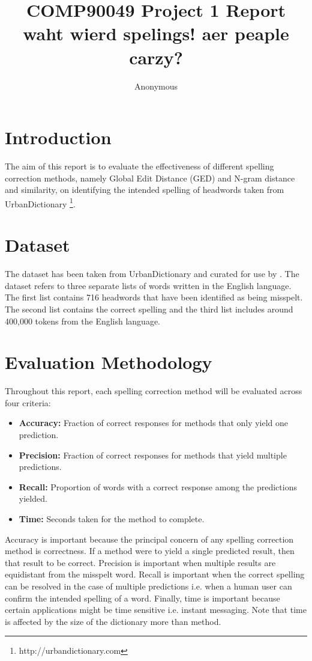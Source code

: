 \documentclass[11pt]{article}
\title{COMP90049 Project 1 Report \\
waht wierd spelings! aer peaple carzy?}
\author{Anonymous}
\begin{document}
\maketitle



\section{Introduction}

The aim of this report is to evaluate the effectiveness of different spelling correction methods, namely Global Edit Distance (GED) and N-gram distance and similarity, on identifying the intended spelling of headwords taken from UrbanDictionary \footnote{http://urbandictionary.com}.

\section{Dataset}
The dataset has been taken from UrbanDictionary and curated for use by . The dataset refers to three separate lists of words written in the English language. The first list contains 716 headwords that have been identified as being misspelt. The second list contains the correct spelling and the third list includes around 400,000 tokens from the English language.


\section{Evaluation Methodology}
Throughout this report, each spelling correction method will be evaluated across four criteria:
\begin{itemize}
	\item \textbf{Accuracy:} Fraction of correct responses for methods that only yield one prediction.
	\item \textbf{Precision:} Fraction of correct responses for methods that yield multiple predictions.
	\item \textbf{Recall:} Proportion of words with a correct response among the predictions yielded.
	\item \textbf{Time:} Seconds taken for the method to complete.
\end{itemize}
Accuracy is important because the principal concern of any spelling correction method is correctness. If a method were to yield a single predicted result, then that result to be correct. Precision is important when multiple results are equidistant from the misspelt word. Recall is important when the correct spelling can be resolved in the case of multiple predictions i.e. when a human user can confirm the intended spelling of a word. Finally, time is important because certain applications might be time sensitive i.e. instant messaging. Note that time is affected by the size of the dictionary more than method.
\end{document}
